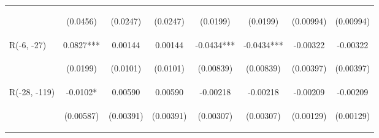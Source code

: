 \documentclass[]{article}
\begin{document}
\begin{center}
\begin{tabular}{lccccccc}
\vspace{4pt} & \begin{footnotesize}(0.0456)\end{footnotesize} & \begin{footnotesize}(0.0247)\end{footnotesize} & \begin{footnotesize}(0.0247)\end{footnotesize} & \begin{footnotesize}(0.0199)\end{footnotesize} & \begin{footnotesize}(0.0199)\end{footnotesize} & \begin{footnotesize}(0.00994)\end{footnotesize} & \begin{footnotesize}(0.00994)\end{footnotesize} \\
R(-6, -27) & 0.0827*** & 0.00144 & 0.00144 & -0.0434*** & -0.0434*** & -0.00322 & -0.00322 \\
\vspace{4pt} & \begin{footnotesize}(0.0199)\end{footnotesize} & \begin{footnotesize}(0.0101)\end{footnotesize} & \begin{footnotesize}(0.0101)\end{footnotesize} & \begin{footnotesize}(0.00839)\end{footnotesize} & \begin{footnotesize}(0.00839)\end{footnotesize} & \begin{footnotesize}(0.00397)\end{footnotesize} & \begin{footnotesize}(0.00397)\end{footnotesize} \\
R(-28, -119) & -0.0102* & 0.00590 & 0.00590 & -0.00218 & -0.00218 & -0.00209 & -0.00209 \\
\vspace{4pt} & \begin{footnotesize}(0.00587)\end{footnotesize} & \begin{footnotesize}(0.00391)\end{footnotesize} & \begin{footnotesize}(0.00391)\end{footnotesize} & \begin{footnotesize}(0.00307)\end{footnotesize} & \begin{footnotesize}(0.00307)\end{footnotesize} & \begin{footnotesize}(0.00129)\end{footnotesize} & \begin{footnotesize}(0.00129)\end{footnotesize} \\

\end{tabular}
\end{center}
\end{document}
